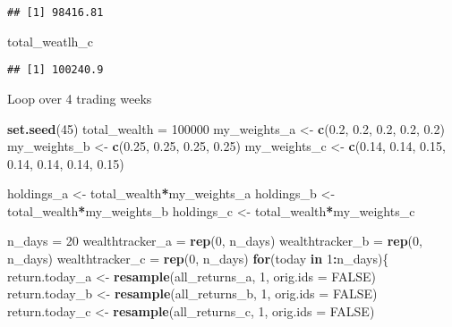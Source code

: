 \documentclass[]{article}
\newenvironment{Shaded}{\begin{snugshade}}{\end{snugshade}}
\newcommand{\ControlFlowTok}[1]{\textcolor[rgb]{0.13,0.29,0.53}{\textbf{#1}}}
\newcommand{\DataTypeTok}[1]{\textcolor[rgb]{0.13,0.29,0.53}{#1}}
\newcommand{\DecValTok}[1]{\textcolor[rgb]{0.00,0.00,0.81}{#1}}
\newcommand{\FloatTok}[1]{\textcolor[rgb]{0.00,0.00,0.81}{#1}}
\newcommand{\KeywordTok}[1]{\textcolor[rgb]{0.13,0.29,0.53}{\textbf{#1}}}
\newcommand{\NormalTok}[1]{#1}
\newcommand{\OperatorTok}[1]{\textcolor[rgb]{0.81,0.36,0.00}{\textbf{#1}}}
\newcommand{\OtherTok}[1]{\textcolor[rgb]{0.56,0.35,0.01}{#1}}
\newcommand{\StringTok}[1]{\textcolor[rgb]{0.31,0.60,0.02}{#1}}
\begin{document}
\begin{verbatim}
## [1] 98416.81
\end{verbatim}

\begin{Shaded}
\begin{Highlighting}[]
\NormalTok{total_weatlh_c}
\end{Highlighting}
\end{Shaded}

\begin{verbatim}
## [1] 100240.9
\end{verbatim}

Loop over 4 trading weeks

\begin{Shaded}
\begin{Highlighting}[]
\KeywordTok{set.seed}\NormalTok{(}\DecValTok{45}\NormalTok{)}
\NormalTok{total_wealth =}\StringTok{ }\DecValTok{100000}
\NormalTok{my_weights_a <-}\StringTok{ }\KeywordTok{c}\NormalTok{(}\FloatTok{0.2}\NormalTok{, }\FloatTok{0.2}\NormalTok{, }\FloatTok{0.2}\NormalTok{, }\FloatTok{0.2}\NormalTok{, }\FloatTok{0.2}\NormalTok{)}
\NormalTok{my_weights_b <-}\StringTok{ }\KeywordTok{c}\NormalTok{(}\FloatTok{0.25}\NormalTok{, }\FloatTok{0.25}\NormalTok{, }\FloatTok{0.25}\NormalTok{, }\FloatTok{0.25}\NormalTok{)}
\NormalTok{my_weights_c <-}\StringTok{ }\KeywordTok{c}\NormalTok{(}\FloatTok{0.14}\NormalTok{, }\FloatTok{0.14}\NormalTok{, }\FloatTok{0.15}\NormalTok{, }\FloatTok{0.14}\NormalTok{, }\FloatTok{0.14}\NormalTok{, }\FloatTok{0.14}\NormalTok{, }\FloatTok{0.15}\NormalTok{)}

\NormalTok{holdings_a <-}\StringTok{ }\NormalTok{total_wealth}\OperatorTok{*}\NormalTok{my_weights_a}
\NormalTok{holdings_b <-}\StringTok{ }\NormalTok{total_wealth}\OperatorTok{*}\NormalTok{my_weights_b}
\NormalTok{holdings_c <-}\StringTok{ }\NormalTok{total_wealth}\OperatorTok{*}\NormalTok{my_weights_c}

\NormalTok{n_days =}\StringTok{ }\DecValTok{20}
\NormalTok{wealthtracker_a =}\StringTok{ }\KeywordTok{rep}\NormalTok{(}\DecValTok{0}\NormalTok{, n_days)}
\NormalTok{wealthtracker_b =}\StringTok{ }\KeywordTok{rep}\NormalTok{(}\DecValTok{0}\NormalTok{, n_days)}
\NormalTok{wealthtracker_c =}\StringTok{ }\KeywordTok{rep}\NormalTok{(}\DecValTok{0}\NormalTok{, n_days)}
\ControlFlowTok{for}\NormalTok{(today }\ControlFlowTok{in} \DecValTok{1}\OperatorTok{:}\NormalTok{n_days)\{}
\NormalTok{  return.today_a <-}\StringTok{ }\KeywordTok{resample}\NormalTok{(all_returns_a, }\DecValTok{1}\NormalTok{, }\DataTypeTok{orig.ids =} \OtherTok{FALSE}\NormalTok{)}
\NormalTok{  return.today_b <-}\StringTok{ }\KeywordTok{resample}\NormalTok{(all_returns_b, }\DecValTok{1}\NormalTok{, }\DataTypeTok{orig.ids =} \OtherTok{FALSE}\NormalTok{)}
\NormalTok{  return.today_c <-}\StringTok{ }\KeywordTok{resample}\NormalTok{(all_returns_c, }\DecValTok{1}\NormalTok{, }\DataTypeTok{orig.ids =} \OtherTok{FALSE}\NormalTok{) }
  

\end{Highlighting}
\end{Shaded}
\end{document}
